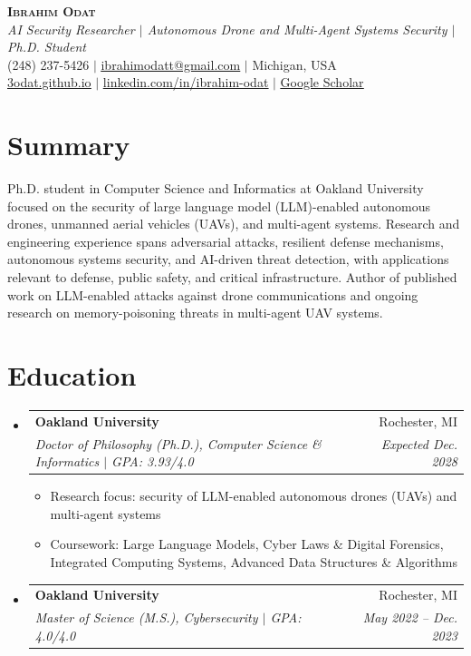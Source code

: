 \documentclass[letterpaper,11pt]{article}
\makeatletter
\newcommand{\resumeItem}[1]{
  \item\small{
    {#1 \vspace{-2pt}}
  }
}
\newcommand{\resumeSubheading}[4]{
  \vspace{-2pt}\item
    \begin{tabular*}{0.97\textwidth}[t]{l@{\extracolsep{\fill}}r}
      \textbf{#1} & #2 \\
      \textit{\small#3} & \textit{\small #4} \\
    \end{tabular*}\vspace{-7pt}
}
\newcommand{\resumeSubHeadingListStart}{\begin{itemize}[leftmargin=0.15in, label={}]}
\newcommand{\resumeSubHeadingListEnd}{\end{itemize}}
\newcommand{\resumeItemListStart}{\begin{itemize}}
\newcommand{\resumeItemListEnd}{\end{itemize}\vspace{-5pt}}
\makeatother
\begin{document}
\begin{center}
    \textbf{\Huge \scshape Ibrahim Odat} \\ \vspace{2pt}
    \small\textit{AI Security Researcher $|$ Autonomous Drone and Multi-Agent Systems Security $|$ Ph.D. Student} \\ \vspace{3pt}
    \small (248) 237-5426 $|$
    \href{mailto:ibrahimodatt@gmail.com}{\underline{ibrahimodatt@gmail.com}} $|$
    Michigan, USA \\ \vspace{1pt}
    \href{https://3odat.github.io}{\underline{3odat.github.io}} $|$
    \href{https://linkedin.com/in/ibrahim-odat}{\underline{linkedin.com/in/ibrahim-odat}} $|$
    \href{https://scholar.google.com/citations?user=U5HR4EcAAAAJ&hl=en}{\underline{Google Scholar}}
\end{center}

\section{Summary}
  \begin{itemize}[leftmargin=0.15in, label={}]
    \small{\item{
      Ph.D. student in Computer Science and Informatics at Oakland University focused on the security of large language model (LLM)-enabled autonomous drones, unmanned aerial vehicles (UAVs), and multi-agent systems. Research and engineering experience spans adversarial attacks, resilient defense mechanisms, autonomous systems security, and AI-driven threat detection, with applications relevant to defense, public safety, and critical infrastructure. Author of published work on LLM-enabled attacks against drone communications and ongoing research on memory-poisoning threats in multi-agent UAV systems.
    }}
  \end{itemize}

\section{Education}
  \resumeSubHeadingListStart
    \resumeSubheading
      {Oakland University}{Rochester, MI}
      {Doctor of Philosophy (Ph.D.), Computer Science \& Informatics $|$ GPA: 3.93/4.0}{Expected Dec. 2028}
      \resumeItemListStart
        \resumeItem{Research focus: security of LLM-enabled autonomous drones (UAVs) and multi-agent systems}
        \resumeItem{Coursework: Large Language Models, Cyber Laws \& Digital Forensics, Integrated Computing Systems, Advanced Data Structures \& Algorithms}
      \resumeItemListEnd
    \resumeSubheading
      {Oakland University}{Rochester, MI}
      {Master of Science (M.S.), Cybersecurity $|$ GPA: 4.0/4.0}{May 2022 -- Dec. 2023}
  \resumeSubHeadingListEnd
\end{document}

